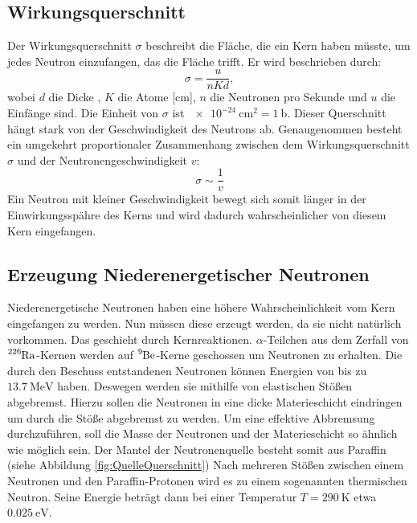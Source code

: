 \subsection{Wirkungsquerschnitt}
\label{subsec:Wirkungsquerschnitt}
Der Wirkungsquerschnitt $\sigma$ beschreibt die Fläche, die ein Kern haben müsste, um jedes Neutron einzufangen, das die Fläche trifft.
Er wird beschrieben durch:
\begin{equation*}
    \sigma =\frac{u}{nKd} ,
\end{equation*}
wobei $d$ die Dicke , $K$ die Atome [\si{\centi\meter}], $n$ die Neutronen pro Sekunde und $u$ die Einfänge sind.
Die Einheit von $\sigma$ ist $\SI{e-24}{\centi\metre\squared} = \SI{1}{\barn}$.
Dieser Querschnitt hängt stark von der Geschwindigkeit des Neutrons ab.
Genaugenommen besteht ein umgekehrt proportionaler Zusammenhang zwischen dem Wirkungsquerschnitt $\sigma$ und der Neutronengeschwindigkeit $v$:
\begin{equation*}
    \sigma \sim \frac{1}{v}
\end{equation*}
Ein Neutron mit kleiner Geschwindigkeit bewegt sich somit länger in der Einwirkungsspähre des Kerns und wird dadurch wahrscheinlicher von diesem Kern eingefangen.

\subsection{Erzeugung Niederenergetischer Neutronen}
\label{subsec:NeutronenHerstellen}
Niederenergetische Neutronen haben eine höhere Wahrscheinlichkeit vom Kern eingefangen zu werden.
Nun müssen diese erzeugt werden, da sie nicht natürlich vorkommen.
Das geschieht durch Kernreaktionen.
$\alpha$-Teilchen aus dem Zerfall von $\ce{^{226}Ra}$-Kernen werden auf $\ce{^{9}Be}$-Kerne geschossen um Neutronen zu erhalten.
Die durch den Beschuss entstandenen Neutronen können Energien von bis zu $\SI{13.7}{\mega\electronvolt}$ haben.
Deswegen werden sie mithilfe von elastischen Stößen abgebremst.
Hierzu sollen die Neutronen in eine dicke Materieschicht eindringen um durch die Stöße abgebremst zu werden.
Um eine effektive Abbremsung durchzuführen, soll die Masse der Neutronen und der Materieschicht so ähnlich wie möglich sein.
Der Mantel der Neutronenquelle besteht somit aus Paraffin (siehe Abbildung \ref{fig:QuelleQuerschnitt})
Nach mehreren Stößen zwischen einem Neutronen und den Paraffin-Protonen wird es zu einem sogenannten thermischen Neutron.
Seine Energie beträgt dann bei einer Temperatur $T = \SI{290}{\kelvin}$ etwa $\SI{0.025}{\electronvolt}$.


